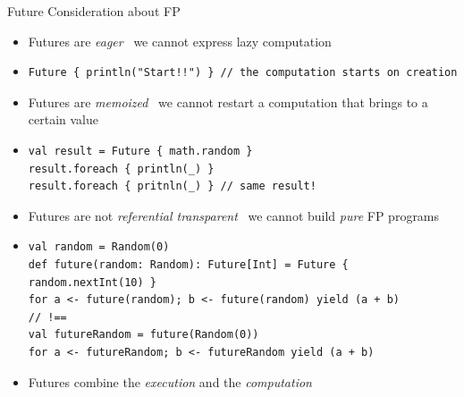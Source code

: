 \documentclass[presentation, 9pt]{beamer}\mode<presentation>{\usetheme{AMSBolognaFC}}
\begin{document}
\begin{frame}[fragile]{Future Consideration about FP}
\begin{itemize}
	\item Futures are \emph{eager} \faArrowRight \, we cannot express lazy computation
	\item[] 	\begin{tcolorbox}[left=0pt, top=0pt, bottom=0pt]
		\begin{verbatim}
Future { println("Start!!") } // the computation starts on creation
		\end{verbatim}
	\end{tcolorbox}
 	\item Futures are \emph{memoized} \faArrowRight \, we cannot restart a computation that brings to a certain value
	 \item[] 	\begin{tcolorbox}[left=0pt, top=0pt, bottom=0pt]
		\begin{verbatim}
val result = Future { math.random }
result.foreach { println(_) }
result.foreach { pritnln(_) } // same result!
		\end{verbatim}
	\end{tcolorbox}
  \item Futures are not \emph{referential transparent} \faArrowRight \, we cannot build \emph{pure} FP programs
	\item[] 	\begin{tcolorbox}[left=0pt, top=0pt, bottom=0pt]
		\begin{verbatim}
val random = Random(0)
def future(random: Random): Future[Int] = Future { random.nextInt(10) }
for a <- future(random); b <- future(random) yield (a + b)
// !==
val futureRandom = future(Random(0))
for a <- futureRandom; b <- futureRandom yield (a + b)
		\end{verbatim}
	\end{tcolorbox}
	\item Futures combine the \emph{execution} and the \emph{computation} 
\end{itemize}
\end{frame}
\end{document}
